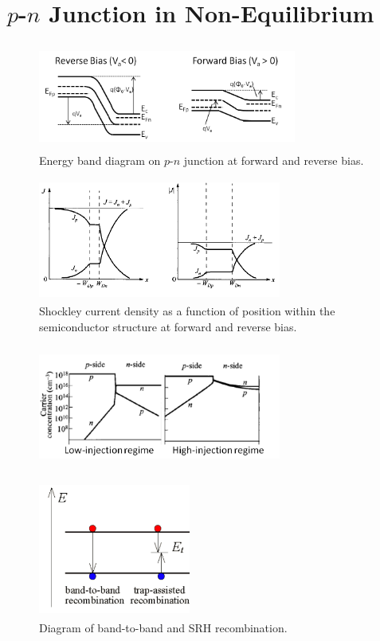 \section{$p$-$n$ Junction in Non-Equilibrium}\label{sec:sec003}

\begin{figure}[h!]\label{fig:fig05}
    \centering
    \includegraphics[height=3.5cm,width=8.5cm]{figs/bias_pn_junction}
    \caption{Energy band diagram on $p$-$n$ junction at forward and reverse bias.}
\end{figure}

\begin{figure}[h!]\label{fig:fig07}
    \centering
    \includegraphics[height=4cm,width=8cm]{figs/schokley_current_reverse_forward}
    \caption{Shockley current density as a function of position within the semiconductor structure at forward and reverse bias.}
\end{figure}

\begin{figure}[h!]\label{fig:fig010}
    \centering
    \includegraphics[height=4cm,width=8cm]{figs/high_low_injection}
    \caption{}
\end{figure}

\begin{figure}[h!]\label{fig:fig08}
    \centering
    \includegraphics[height=4.5cm,width=5cm]{figs/recomb}
    \caption{Diagram of band-to-band and SRH recombination.}
\end{figure}